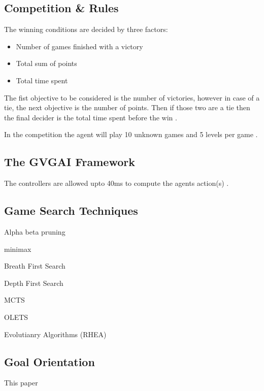 \documentclass[journal]{IEEEtran}
\begin{document}
\subsection{Competition \& Rules}

The winning conditions are decided by three factors:
\begin{itemize}
    \item Number of games finished with a victory
    \item Total sum of points
    \item Total time spent
\end{itemize}
The fist objective to be considered is the number of victories, however in case of a tie, the next objective is the number of points. Then if those two are a tie then the final decider is the total time spent before the win \cite{perez20162014}.

In the competition the agent will play 10 unknown games and 5 levels per game \cite{schuster2015mcts}.

\subsection{The GVGAI Framework}
The controllers are allowed upto 40ms to compute the agents action(s) \cite{perez2016GVGAICompetition, GVGAI}.






\subsection{Game Search Techniques}

Alpha beta pruning

minimax

Breath First Search

Depth First Search

MCTS

OLETS


Evolutianry Algorithms
(RHEA)







\subsection{Goal Orientation}
This paper 
\cite{ross2014general}
\end{document}
